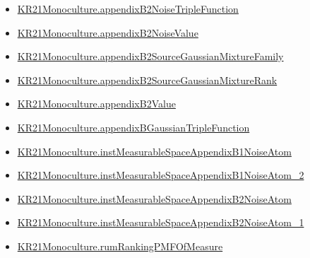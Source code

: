 \documentclass[10pt]{article}
\begin{document}
\begin{itemize}
\item \hyperlink{governing-declaration-60847befce1f016f}{KR21\allowbreak{}Monoculture.\allowbreak{}appendix\allowbreak{}B2\allowbreak{}Noise\allowbreak{}Triple\allowbreak{}Function}
\item \hyperlink{governing-declaration-c2e627e448258a0b}{KR21\allowbreak{}Monoculture.\allowbreak{}appendix\allowbreak{}B2\allowbreak{}Noise\allowbreak{}Value}
\item \hyperlink{governing-declaration-a58e9f1ca8d07877}{KR21\allowbreak{}Monoculture.\allowbreak{}appendix\allowbreak{}B2\allowbreak{}Source\allowbreak{}Gaussian\allowbreak{}Mixture\allowbreak{}Family}
\item \hyperlink{governing-declaration-90a6793e2b61850e}{KR21\allowbreak{}Monoculture.\allowbreak{}appendix\allowbreak{}B2\allowbreak{}Source\allowbreak{}Gaussian\allowbreak{}Mixture\allowbreak{}Rank}
\item \hyperlink{governing-declaration-302704452f418635}{KR21\allowbreak{}Monoculture.\allowbreak{}appendix\allowbreak{}B2\allowbreak{}Value}
\item \hyperlink{governing-declaration-993f8c490999126c}{KR21\allowbreak{}Monoculture.\allowbreak{}appendix\allowbreak{}B\allowbreak{}Gaussian\allowbreak{}Triple\allowbreak{}Function}
\item \hyperlink{governing-declaration-1aba67b6faabf336}{KR21\allowbreak{}Monoculture.\allowbreak{}inst\allowbreak{}Measurable\allowbreak{}Space\allowbreak{}Appendix\allowbreak{}B1\allowbreak{}Noise\allowbreak{}Atom}
\item \hyperlink{governing-declaration-0e5e99abc0d2bb6e}{KR21\allowbreak{}Monoculture.\allowbreak{}inst\allowbreak{}Measurable\allowbreak{}Space\allowbreak{}Appendix\allowbreak{}B1\allowbreak{}Noise\allowbreak{}Atom\_\allowbreak{}2}
\item \hyperlink{governing-declaration-7b2eea0fb1b02be5}{KR21\allowbreak{}Monoculture.\allowbreak{}inst\allowbreak{}Measurable\allowbreak{}Space\allowbreak{}Appendix\allowbreak{}B2\allowbreak{}Noise\allowbreak{}Atom}
\item \hyperlink{governing-declaration-118ab3120410233a}{KR21\allowbreak{}Monoculture.\allowbreak{}inst\allowbreak{}Measurable\allowbreak{}Space\allowbreak{}Appendix\allowbreak{}B2\allowbreak{}Noise\allowbreak{}Atom\_\allowbreak{}1}
\item \hyperlink{governing-declaration-ba11126c32f3deba}{KR21\allowbreak{}Monoculture.\allowbreak{}rum\allowbreak{}Ranking\allowbreak{}PMF\allowbreak{}Of\allowbreak{}Measure}
\end{itemize}
\end{document}
